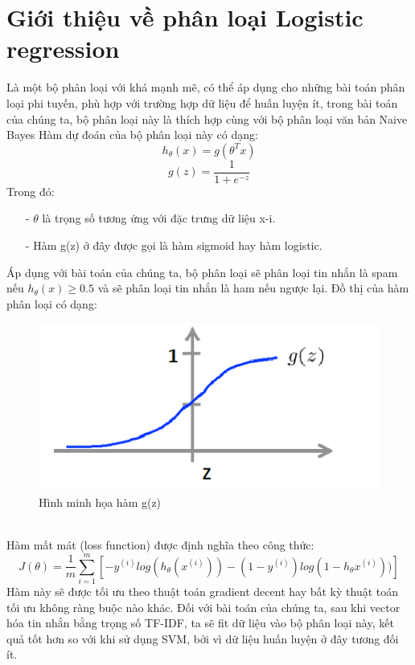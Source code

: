 \documentclass[a4paper,11pt]{report}
\begin{document}
\section{Giới thiệu về phân loại Logistic regression}
Là một bộ phân loại với khá mạnh mẽ, có thể áp dụng cho những bài toán phân loại phi tuyến, phù hợp với trường hợp dữ liệu để huấn luyện ít, trong bài toán của chúng ta, bộ phân loại này là thích hợp cùng với bộ phân loại văn bản Naive Bayes
Hàm dự đoán của bộ phân loại này có dạng:
\begin{displaymath}
h_{\theta}(x) = g(\theta^T x)
\end{displaymath}
\begin{displaymath}
g(z) = \frac{1}{1 + e^{-z}}
\end{displaymath}
Trong đó:
\begin{itemize}
\item[-] $\theta$ là trọng số tương ứng với đặc trưng dữ liệu x-i.
\item[-] Hàm g(z) ở đây được gọi là hàm sigmoid hay hàm logistic.
\end{itemize}
Áp dụng với bài toán của chúng ta, bộ phân loại sẽ phân loại tin nhắn là spam nếu $h_{\theta}(x) \geq 0.5$ và sẽ phân loại tin nhắn là ham nếu ngược lại. Đồ thị của hàm phân loại có dạng:
\begin{figure}[h]
\begin{center}
\includegraphics[scale=0.8]{gz.png}
\caption{Hình minh họa hàm g(z)}
\end{center}
\end{figure}
\\
Hàm mất mát (loss function) được định nghĩa theo công thức:
\begin{displaymath}
\displaystyle
J(\theta) = \frac{1}{m}\sum_{i=1}^{m}[-y^{(i)}log(h_\theta(x^{(i)})) - (1 - y^{(i)})log(1 - h_\theta x^{(i)}))]
\end{displaymath}
Hàm này sẽ được tối ưu theo thuật toán gradient decent hay bất kỳ thuật toán tối ưu không ràng buộc nào khác. Đối với bài toán của chúng ta, sau khi vector hóa tin nhắn bằng trọng số TF-IDF, ta sẽ fit dữ liệu vào bộ phân loại này, kết quả tốt hơn so với khi sử dụng SVM, bởi vì dữ liệu huấn luyện ở đây tương đối ít.
\end{document}
